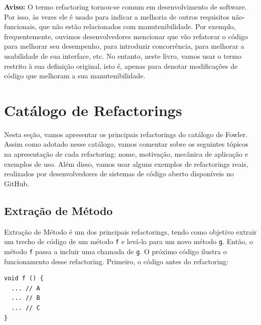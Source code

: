 \documentclass[
  11pt,
  twoside]{book}
\newcommand{\passthrough}[1]{#1}
\newenvironment{aviso}{\centering \vspace{1.5ex} \begin{tcolorbox}[breakable, colback=backcolor, width=4.9in]}{\end{tcolorbox} \vspace{1.5ex}}
\begin{document}
\begin{aviso}

\textbf{Aviso:} O termo refactoring tornou-se comum em desenvolvimento
de software. Por isso, às vezes ele é usado para indicar a melhoria de
outros requisitos não-funcionais, que não estão relacionados com
manutenibilidade. Por exemplo, frequentemente, ouvimos desenvolvedores
mencionar que vão refatorar o código para melhorar seu desempenho, para
introduzir concorrência, para melhorar a usabilidade de sua interface,
etc. No entanto, neste livro, vamos usar o termo restrito à sua
definição original, isto é, apenas para denotar modificações de código
que melhoram a sua manutenibilidade.

\end{aviso}

\hypertarget{catuxe1logo-de-refactorings}{%
\section{Catálogo de Refactorings}\label{catuxe1logo-de-refactorings}}

Nesta seção, vamos apresentar os principais refactorings do catálogo de
Fowler. Assim como adotado nesse catálogo, vamos comentar sobre os
seguintes tópicos na apresentação de cada refactoring: nome, motivação,
mecânica de aplicação e exemplos de uso. Além disso, vamos usar alguns
exemplos de refactorings reais, realizados por desenvolvedores de
sistemas de código aberto disponíveis no GitHub.

\hypertarget{extrauxe7uxe3o-de-muxe9todo}{%
\subsection{Extração de Método}\label{extrauxe7uxe3o-de-muxe9todo}}


Extração de Método é um dos principais refactorings, tendo como objetivo
extrair um trecho de código de um método \passthrough{\lstinline!f!} e
levá-lo para um novo método \passthrough{\lstinline!g!}. Então, o método
\passthrough{\lstinline!f!} passa a incluir uma chamada de
\passthrough{\lstinline!g!}. O próximo código ilustra o funcionamento
desse refactoring. Primeiro, o código antes do refactoring:

\begin{lstlisting}
void f () {
  ... // A
  ... // B 
  ... // C
}
\end{lstlisting}
\end{document}
